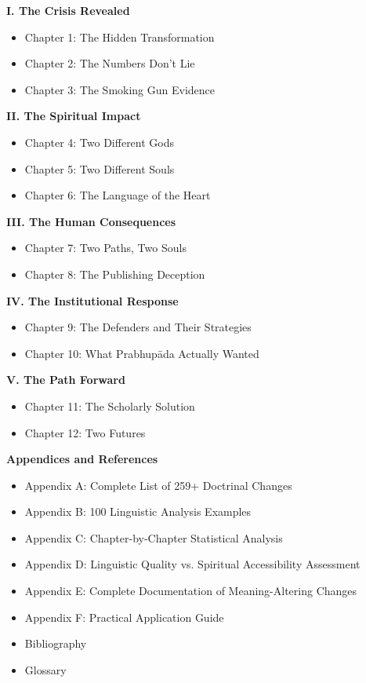 \documentclass[11pt,twoside]{book}
\begin{document}
\textbf{I.  The Crisis Revealed}
\begin{itemize}
\item Chapter 1: The Hidden Transformation
\item Chapter 2: The Numbers Don't Lie
\item Chapter 3: The Smoking Gun Evidence
\end{itemize}

\textbf{II.  The Spiritual Impact}
\begin{itemize}
\item Chapter 4: Two Different Gods
\item Chapter 5: Two Different Souls
\item Chapter 6: The Language of the Heart
\end{itemize}

\textbf{III.  The Human Consequences}
\begin{itemize}
\item Chapter 7: Two Paths, Two Souls
\item Chapter 8: The Publishing Deception
\end{itemize}

\textbf{IV.  The Institutional Response}
\begin{itemize}
\item Chapter 9: The Defenders and Their Strategies
\item Chapter 10: What Prabhupāda Actually Wanted
\end{itemize}

\newpage
\thispagestyle{empty}

\textbf{V.  The Path Forward}
\begin{itemize}
\item Chapter 11: The Scholarly Solution
\item Chapter 12: Two Futures
\end{itemize}

\textbf{Appendices and References}
\begin{itemize}
\item Appendix A: Complete List of 259+ Doctrinal Changes
\item Appendix B: 100 Linguistic Analysis Examples
\item Appendix C: Chapter-by-Chapter Statistical Analysis
\item Appendix D: Linguistic Quality vs. Spiritual Accessibility Assessment
\item Appendix E: Complete Documentation of Meaning-Altering Changes
\item Appendix F: Practical Application Guide
\item Bibliography
\item Glossary
\end{itemize}
\end{document}
